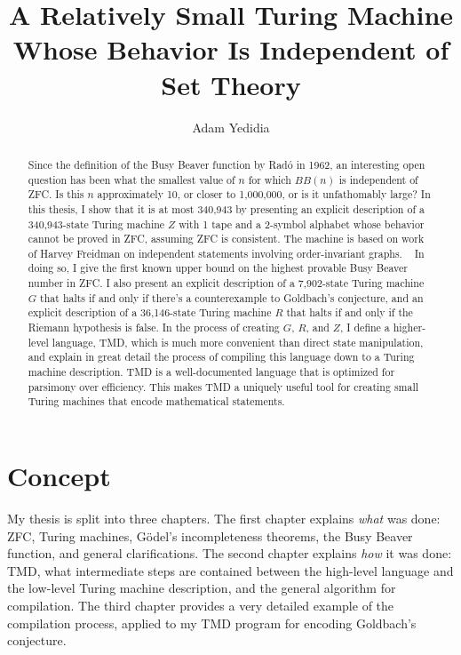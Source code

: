 \documentclass[11pt]{report}
\newcommand{\statenumstate}{340,943-state }
\newcommand{\statenum}{340,943 }
\newcommand{\gbstatenumstate}{7,902-state }
\newcommand{\rmstatenumstate}{36,146-state }
\begin{document}
\title{A Relatively Small Turing Machine Whose Behavior Is Independent of Set Theory}
\author{Adam Yedidia}

\maketitle

\begin{abstract}

Since the definition of the Busy Beaver function by Rad\'{o} in 1962, an interesting open question has been what the smallest value of $n$ for which $BB(n)$ is independent of ZFC. Is this $n$ approximately 10, or closer to 1,000,000, or is it unfathomably large? In this thesis, I show that it is at most \statenum by presenting an explicit description of a \statenumstate Turing machine $Z$ with 1 tape and a 2-symbol alphabet whose behavior cannot be proved in ZFC, assuming ZFC is consistent. The machine is based on work of Harvey Freidman on independent statements involving order-invariant graphs. \cite{friedman}~
In doing so, I give the first known upper bound on the highest provable Busy Beaver number in ZFC. I also present an explicit description of a \gbstatenumstate Turing machine $G$ that halts if and only if there's a counterexample to Goldbach's conjecture, and an explicit description of a \rmstatenumstate Turing machine $R$ that halts if and only if the Riemann hypothesis is false. In the process of creating $G$, $R$, and $Z$, I define a higher-level language, TMD, which is much more convenient than direct state manipulation, and explain in great detail the process of compiling this language down to a Turing machine description. TMD is a well-documented language that is optimized for parsimony over efficiency. This makes TMD a uniquely useful tool for creating small Turing machines that encode mathematical statements. 

\end{abstract}

\chapter{Concept}

My thesis is split into three chapters. The first chapter explains \emph{what} was done: ZFC, Turing machines, G\"{o}del's incompleteness theorems, the Busy Beaver function, and general clarifications. The second chapter explains \emph{how} it was done: TMD, what intermediate steps are contained between the high-level language and the low-level Turing machine description, and the general algorithm for compilation. The third chapter provides a very detailed example of the compilation process, applied to my TMD program for encoding Goldbach's conjecture.
\end{document}
